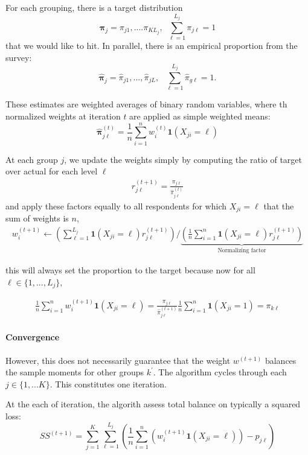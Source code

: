 \documentclass[11pt]{article}
\begin{document}
For each grouping, there is a target distribution \[\bm{\pi}_j = \pi_{j1}, .... \pi_{KL_j}, ~~ \sum^{L_{j}}_{\ell = 1}\pi_{j\ell} = 1\] that we would like to hit. In parallel, there is an empirical proportion from the survey: \[\widehat{\bm{\pi}}_j = \widehat{\pi}_{j1},  ..., \widehat{\pi}_{jL}, ~~~\sum^{L_{j}}_{\ell = 1}\hat{\pi}_{g\ell} = 1.\]

These estimates are weighted averages of binary random variables, where th normalized weights at iteration \(t\) are applied as simple weighted means:
\[\bm{\widehat{\pi}}^{(t)}_{j\ell} = \frac{1}{n}\sum^n_{i=1}w_i^{(t)} \mathbf{1}(X_{ji} = \ell)\]

At each group \(j\), we update the weights simply by computing the ratio of target over actual for each level \(\ell\)
\begin{align}
r_{j\ell}^{(t+1)} = \frac{\pi_{j\ell}}{\widehat{\pi}^{(t)}_{j\ell}}
\end{align}
and apply these factors equally to all respondents for which \(X_{ji} = \ell\) that the sum of weights is \(n\),
\begin{align}
w_i^{(t+1)} \leftarrow \left(\sum^{L_j}_{\ell = 1}\mathbf{1}(X_{ji} = \ell)r_{j\ell}^{(t+1)}\right) \bigg / \underbrace{\left(\frac{1}{n}\sum^n_{i=1}\mathbf{1}(X_{ji} = \ell)r_{j\ell}^{(t+1)}\right)}_{\text{Normalizing factor}}
\end{align}

this will always set the proportion to the target because now for all \( \ell \in \{1, ..., L_j\},\)

\begin{align}
\frac{1}{n}\sum^n_{i=1}w_i^{(t+1)} \mathbf{1}(X_{ji} = \ell) =\frac{\pi_{j\ell}}{\widehat{\pi}^{(t+1)}_{j\ell}}\frac{1}{n}\sum^n_{i=1}\mathbf{1}(X_{ji} = 1) = \pi_{k\ell}
\end{align}

\paragraph{Convergence}
However, this does not necessarily guarantee that the weight \(w^{(t+1)}\) balances the sample moments for other groups \(k^{\prime}\). The algorithm cycles through each \(j \in \{1, ... K\}\). This constitutes one iteration.

At the each of iteration, the algorith assess total balance on typically a  squared loss:
\[SS^{(t+1)} = \sum^K_{j=1}\sum^{L_{j}}_{\ell = 1}\left(\frac{1}{n}\sum^n_{i=1}(w_i^{(t+1)}\mathbf{1}(X_{ji} = \ell)) - p_{j\ell}\right)\]
\end{document}
